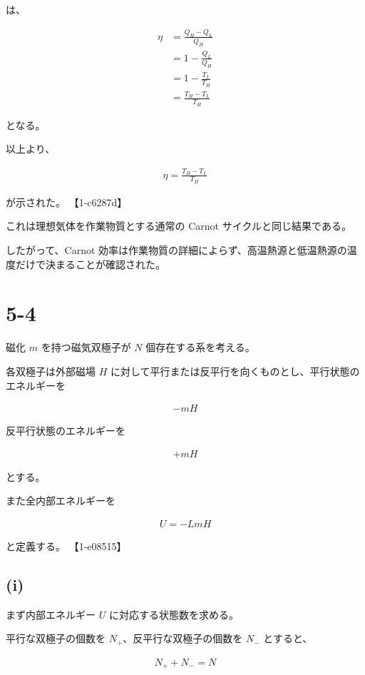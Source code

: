 \documentclass[platex,dvipdfmx,a4paper]{jsarticle}
\begin{document}
は、

\begin{align*}
\eta
&=
\frac{Q_H-Q_L}{Q_H}
\\
&=
1-\frac{Q_L}{Q_H}
\\
&=
1-\frac{T_L}{T_H}
\\
&=
\frac{T_H-T_L}{T_H}
\end{align*}

となる。

以上より、

\begin{align*}
\eta
=
\frac{T_H-T_L}{T_H}
\end{align*}

が示された。 【1-c6287d】

これは理想気体を作業物質とする通常の Carnot サイクルと同じ結果である。

したがって、Carnot 効率は作業物質の詳細によらず、高温熱源と低温熱源の温度だけで決まることが確認された。
\section{5-4}

磁化 $m$ を持つ磁気双極子が $N$ 個存在する系を考える。

各双極子は外部磁場 $H$ に対して平行または反平行を向くものとし、平行状態のエネルギーを

\begin{align*}
-mH
\end{align*}

反平行状態のエネルギーを

\begin{align*}
+mH
\end{align*}

とする。

また全内部エネルギーを

\begin{align*}
U=-LmH
\end{align*}

と定義する。 【1-e08515】

\subsection{(i)}

まず内部エネルギー $U$ に対応する状態数を求める。

平行な双極子の個数を $N_+$、反平行な双極子の個数を $N_-$ とすると、

\begin{align*}
N_++N_-=N
\end{align*}
\end{document}
